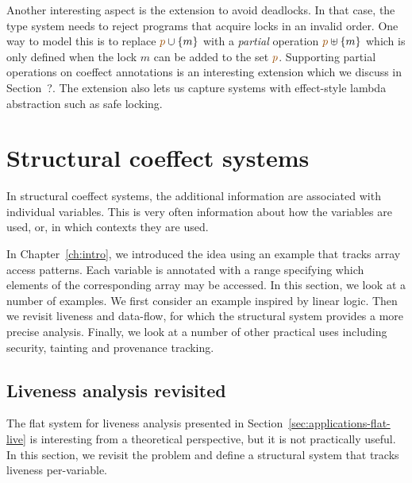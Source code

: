 Another interesting aspect is the extension to avoid deadlocks. In that case, the type system
needs to reject programs that acquire locks in an invalid order. One way to model this is to 
replace $\aclrd{p} \cup \{m\}$ with a \emph{partial} operation $\aclrd{p} \uplus \{m\}$ which
is only defined when the lock $m$ can be added to the set $\aclrd{p}$. Supporting partial 
operations on coeffect annotations is an interesting extension which we discuss in Section~?.
The extension also lets us capture systems with effect-style lambda abstraction such as safe
locking.


\section{Structural coeffect systems}

In structural coeffect systems, the additional information are associated with individual variables.
This is very often information about how the variables are used, or, in which contexts they are 
used. 

In Chapter~\ref{ch:intro}, we introduced the idea using an example that tracks array access patterns.  
Each variable is annotated with a range specifying which elements of the corresponding array 
may be accessed. In this section, we look at a number of examples. We first consider an example
inspired by linear logic. Then we revisit liveness and data-flow, for which the structural system 
provides a more precise analysis. Finally, we look at a number of other practical uses including 
security, tainting and provenance tracking.


\subsection{Liveness analysis revisited}
\label{sec:applications-struct-live}

The flat system for liveness analysis presented in Section~\ref{sec:applications-flat-live} is 
interesting from a theoretical perspective, but it is not practically useful. In this section, we
revisit the problem and define a structural system that tracks liveness per-variable.


